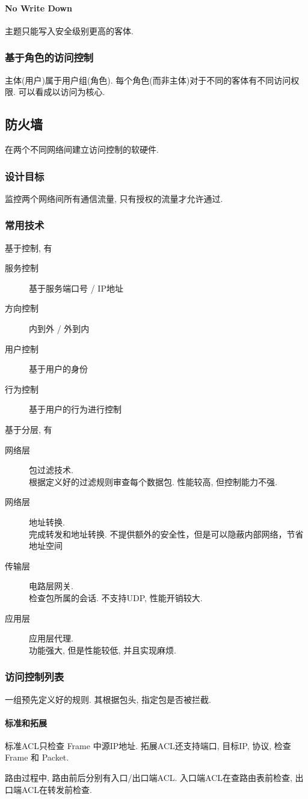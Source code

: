 \documentclass{ctexart}
\begin{document}
\paragraph{No Write Down} 主题只能写入安全级别更高的客体.
\subsubsection{基于角色的访问控制} 主体(用户)属于用户组(角色). 每个角色(而非主体)对于不同的客体有不同访问权限. 
    可以看成以访问为核心.

\subsection{防火墙} 在两个不同网络间建立访问控制的软硬件.
\subsubsection{设计目标} 监控两个网络间所有通信流量, 只有授权的流量才允许通过.
\subsubsection{常用技术} 基于控制, 有\begin{description}
        \item[服务控制] 基于服务端口号 / IP地址
        \item[方向控制] 内到外 / 外到内
        \item[用户控制] 基于用户的身份
        \item[行为控制] 基于用户的行为进行控制
    \end{description}基于分层, 有\begin{description}
        \item[网络层] 包过滤技术.\\ 根据定义好的过滤规则审查每个数据包. 性能较高, 但控制能力不强.
        \item[网络层] 地址转换.\\ 完成转发和地址转换. 不提供额外的安全性，但是可以隐蔽内部网络，节省地址空间
        \item[传输层] 电路层网关.\\ 检查包所属的会话. 不支持UDP, 性能开销较大.
        \item[应用层] 应用层代理.\\ 功能强大, 但是性能较低, 并且实现麻烦.
    \end{description}
\subsubsection{访问控制列表} 一组预先定义好的规则. 其根据包头, 指定包是否被拦截.
\paragraph{标准和拓展} 标准ACL只检查 Frame 中源IP地址.
    拓展ACL还支持端口, 目标IP, 协议, 检查 Frame 和 Packet.\par
    路由过程中, 路由前后分别有入口/出口端ACL. 入口端ACL在查路由表前检查, 出口端ACL在转发前检查.
\end{document}
